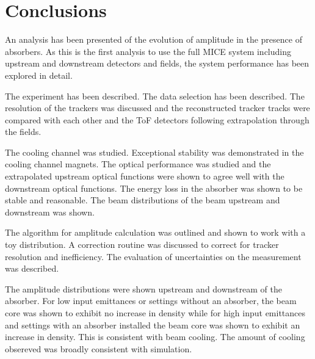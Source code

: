 \section{Conclusions}

An analysis has been presented of the evolution of amplitude in the presence of
absorbers. As this is the first analysis to use the full MICE system including
upstream and downstream detectors and fields, the system performance has been
explored in detail.

The experiment has been described. The data selection has been described. The
resolution of the trackers was discussed and the reconstructed tracker tracks
were compared with each other and the ToF detectors following extrapolation 
through the fields. 

The cooling channel was studied. Exceptional stability was demonstrated in the 
cooling channel magnets. The optical performance was studied and the extrapolated
upstream optical functions were shown to agree well with the downstream optical
functions. The energy loss in the absorber was shown to be stable and reasonable.
The beam distributions of the beam upstream and downstream was shown.

The algorithm for amplitude calculation was outlined and shown to work with a 
toy distribution. A correction routine was discussed to correct for tracker 
resolution and inefficiency. The evaluation of uncertainties on the measurement
was described.

The amplitude distributions were shown upstream and downstream of the absorber.
For low input emittances or settings without an absorber, the beam core was shown
to exhibit no increase in density while for high input emittances and settings
with an absorber installed the beam core was shown to exhibit an increase in
density. This is consistent with beam cooling. The amount of cooling obsereved 
was broadly consistent with simulation.
